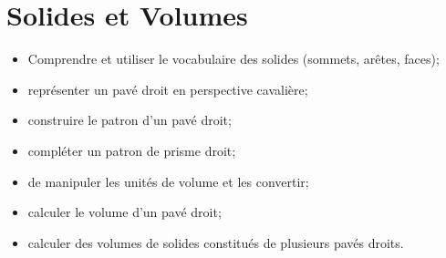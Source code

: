 \chapter{Solides et Volumes}\label{ChSolidesVolumes}


\vspace{5cm}
\begin{acquis}
\begin{itemize}
\item Comprendre et utiliser le vocabulaire des solides (sommets, arêtes, faces);
\item représenter un pavé droit en perspective cavalière;
\item construire le patron d’un pavé droit;
\item compléter un patron de prisme droit;
\item de manipuler les unités de volume et les convertir;
\item calculer le volume d’un pavé droit;
\item calculer des volumes de solides constitués de plusieurs pavés droits.
\end{itemize}
\end{acquis}

\activites



\cours


\exercicesbase
\begin{colonne*exercice}

\end{colonne*exercice}


\exercicesappr
\begin{colonne*exercice}

\end{colonne*exercice}

\connaissances


\TravauxPratiques %


\pagebreak

\recreation



